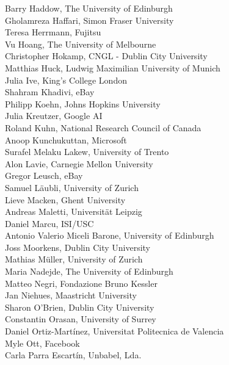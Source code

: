 \documentclass[a4paper,11pt,twoside]{book}
\begin{document}
\noindent Barry Haddow, The University of Edinburgh\\
\noindent Gholamreza Haffari, Simon Fraser University\\
\noindent Teresa Herrmann, Fujitsu\\
\noindent Vu Hoang, The University of Melbourne\\
\noindent Christopher Hokamp, CNGL - Dublin City University\\
\noindent Matthias Huck, Ludwig Maximilian University of Munich\\
\noindent Julia Ive, King’s College London\\
\noindent Shahram Khadivi, eBay\\
\noindent Philipp Koehn, Johns Hopkins University\\
\noindent Julia Kreutzer, Google AI\\
\noindent Roland Kuhn, National Research Council of Canada\\
\noindent Anoop Kunchukuttan, Microsoft\\
\noindent Surafel Melaku Lakew, University of Trento\\
\noindent Alon Lavie, Carnegie Mellon University\\
\noindent Gregor Leusch, eBay\\
\noindent Samuel Läubli, University of Zurich\\
\noindent Lieve Macken, Ghent University\\
\noindent Andreas Maletti, Universität Leipzig\\
\noindent Daniel Marcu, ISI/USC\\
\noindent Antonio Valerio Miceli Barone, University of Edinburgh\\
\noindent Joss Moorkens, Dublin City University\\
\noindent Mathias Müller, University of Zurich\\
\noindent Maria Nadejde, The University of Edinburgh\\
\noindent Matteo Negri, Fondazione Bruno Kessler\\
\noindent Jan Niehues, Maastricht University\\
\noindent Sharon O'Brien, Dublin City University\\
\noindent Constantin Orasan, University of Surrey\\
\noindent Daniel Ortiz-Martínez, Universitat Politecnica de Valencia\\
\noindent Myle Ott, Facebook\\
\noindent Carla Parra Escartín, Unbabel, Lda.\\
\end{document}

